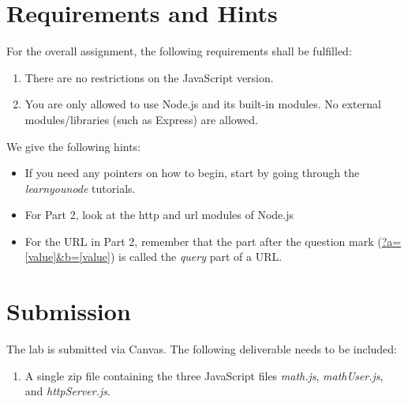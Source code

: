 \documentclass[a4paper,11pt,fleqn]{article}
\begin{document}
\section{Requirements and Hints}
For the overall assignment, the following requirements shall be fulfilled:
\begin{enumerate}
\item There are no restrictions on the JavaScript version.
\item You are only allowed to use Node.js and its built-in modules. No external modules/libraries (such as Express) are allowed.
\end{enumerate}

We give the following hints:
\begin{itemize}
\item If you need any pointers on how to begin, start by going through the \emph{learnyounode} tutorials.
\item For Part 2, look at the http and url modules of Node.js
\item For the URL in Part 2, remember that the part after the question mark (\url{?a=[value]&b=[value]}) is called the \emph{query} part of a URL.
\end{itemize}

\section*{Submission}
The lab is submitted via Canvas. The following deliverable needs to be included:

\begin{enumerate}
\item A single zip file containing the three JavaScript files \emph{math.js}, \emph{mathUser.js}, and \emph{httpServer.js}.
\end{enumerate}
\newpage


%
\end{document}
